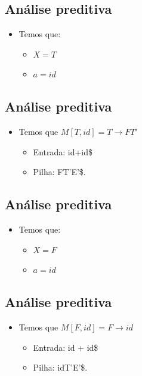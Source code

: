 \documentclass[11pt]{article}
\begin{document}
\subsection*{Análise preditiva}
\label{sec:org10623b7}

\begin{itemize}
\item Temos que:
\begin{itemize}
\item \(X = T\)
\item \(a = id\)
\end{itemize}
\end{itemize}
\subsection*{Análise preditiva}
\label{sec:org9f7e5c0}

\begin{itemize}
\item Temos que \(M[T,id] = T\to FT'\)
\begin{itemize}
\item Entrada: id+id\$
\item Pilha: FT'E'\$.
\end{itemize}
\end{itemize}
\subsection*{Análise preditiva}
\label{sec:orge545354}

\begin{itemize}
\item Temos que:
\begin{itemize}
\item \(X = F\)
\item \(a = id\)
\end{itemize}
\end{itemize}
\subsection*{Análise preditiva}
\label{sec:org2e0e302}

\begin{itemize}
\item Temos que \(M[F,id] = F \to id\)
\begin{itemize}
\item Entrada: id + id\$
\item Pilha: idT'E'\$.
\end{itemize}
\end{itemize}
\end{document}
